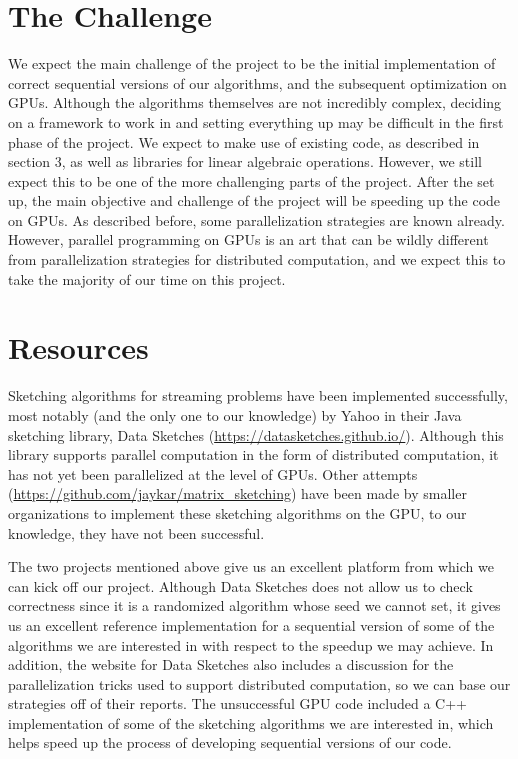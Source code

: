 \documentclass[12pt]{article}
\begin{document}
\section{The Challenge}
We expect the main challenge of the project to be the initial implementation of correct sequential versions of our algorithms, and the subsequent optimization on GPUs. Although the algorithms themselves are not incredibly complex, deciding on a framework to work in and setting everything up may be difficult in the first phase of the project. We expect to make use of existing code, as described in section 3, as well as libraries for linear algebraic operations. However, we still expect this to be one of the more challenging parts of the project. After the set up, the main objective and challenge of the project will be speeding up the code on GPUs. As described before, some parallelization strategies are known already. However, parallel programming on GPUs is an art that can be wildly different from parallelization strategies for distributed computation, and we expect this to take the majority of our time on this project.

\section{Resources}
Sketching algorithms for streaming problems have been implemented successfully, most notably (and the only one to our knowledge) by Yahoo in their Java sketching library, Data Sketches (\url{https://datasketches.github.io/}). Although this library supports parallel computation in the form of distributed computation, it has not yet been parallelized at the level of GPUs. Other attempts (\url{https://github.com/jaykar/matrix_sketching}) have been made by smaller organizations to implement these sketching algorithms on the GPU, to our knowledge, they have not been successful. 

The two projects mentioned above give us an excellent platform from which we can kick off our project. Although Data Sketches does not allow us to check correctness since it is a randomized algorithm whose seed we cannot set, it gives us an excellent reference implementation for a sequential version of some of the algorithms we are interested in with respect to the speedup we may achieve. In addition, the website for Data Sketches also includes a discussion for the parallelization tricks used to support distributed computation, so we can base our strategies off of their reports. The unsuccessful GPU code included a C++ implementation of some of the sketching algorithms we are interested in, which helps speed up the process of developing sequential versions of our code. 
\end{document}
